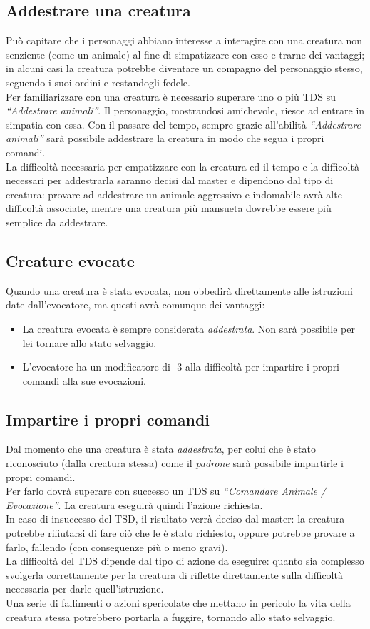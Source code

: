 \documentclass[../manuale_main.tex]{subfiles}
\begin{document}
\subsection{Addestrare una creatura}
Può capitare che i personaggi abbiano interesse a interagire con una creatura non senziente (come un animale) al fine di simpatizzare con esso e trarne dei vantaggi; in alcuni casi la creatura potrebbe diventare un compagno del personaggio stesso, seguendo i suoi ordini e restandogli fedele.\\
Per familiarizzare con una creatura è necessario superare uno o più TDS su \emph{``Addestrare animali''}. Il personaggio, mostrandosi amichevole, riesce ad entrare in simpatia con essa. Con il passare del tempo, sempre grazie all'abilità \emph{``Addestrare animali''} sarà possibile addestrare la creatura in modo che segua i propri comandi.\\
La difficoltà necessaria per empatizzare con la creatura ed il tempo e la difficoltà necessari per addestrarla saranno decisi dal master e dipendono dal tipo di creatura: provare ad addestrare un animale aggressivo e indomabile avrà alte difficoltà associate, mentre una creatura più mansueta dovrebbe essere più semplice da addestrare. 

\subsection{Creature evocate}
Quando una creatura è stata evocata, non obbedirà direttamente alle istruzioni date dall'evocatore, ma questi avrà comunque dei vantaggi:
\begin{itemize}
\item La creatura evocata è sempre considerata \emph{addestrata}. Non sarà possibile per lei tornare allo stato selvaggio.
\item L'evocatore ha un modificatore di -3 alla difficoltà per impartire i propri comandi alla sue evocazioni.
\end{itemize}

\subsection{Impartire i propri comandi}
Dal momento che una creatura è stata \emph{addestrata}, per colui che è stato riconosciuto (dalla creatura stessa) come il \emph{padrone} sarà possibile impartirle i propri comandi.\\
Per farlo dovrà superare con successo un TDS su \emph{``Comandare Animale / Evocazione''}. La creatura eseguirà quindi l'azione richiesta.\\
In caso di insuccesso del TSD, il risultato verrà deciso dal master: la creatura potrebbe rifiutarsi di fare ciò che le è stato richiesto, oppure potrebbe provare a farlo, fallendo (con conseguenze più o meno gravi).\\
La difficoltà del TDS dipende dal tipo di azione da eseguire: quanto sia complesso svolgerla correttamente per la creatura di riflette direttamente sulla difficoltà necessaria per darle quell'istruzione.\\
Una serie di fallimenti o azioni spericolate che mettano in pericolo la vita della creatura stessa potrebbero portarla a fuggire, tornando allo stato selvaggio.
\end{document}
